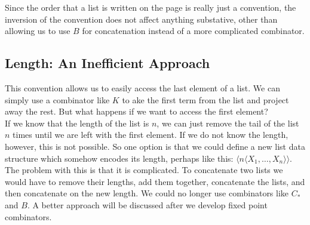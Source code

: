 Since the order that a list is written on the page is really just a convention, the inversion of the convention does not affect anything substative, other than allowing us to use $B$ for concatenation instead of a more complicated combinator.

\subsection{Length: An Inefficient Approach}
This convention allows us to easily access the last element of a list. We can simply use a combinator like $K$ to ake the first term from the list and project away the rest. But what happens if we want to access the first element?\\

 If we know that the length of the list is $n$, we can just remove the tail of the list $n$ times until we are left with the first element. If we do not know the length, however, this is not possible. So one option is that we could define a new list data structure which somehow encodes its length, perhaps like this: $\langle n \langle X_1,\ldots,X_n\rangle \rangle$.\\

The problem with this is that it is complicated. To concatenate two lists we would have to remove their lengths, add them together, concatenate the lists, and then concatenate on the new length. We could no longer use combinators like $C_*$ and $B$. A better approach will be discussed after we develop fixed point combinators.

